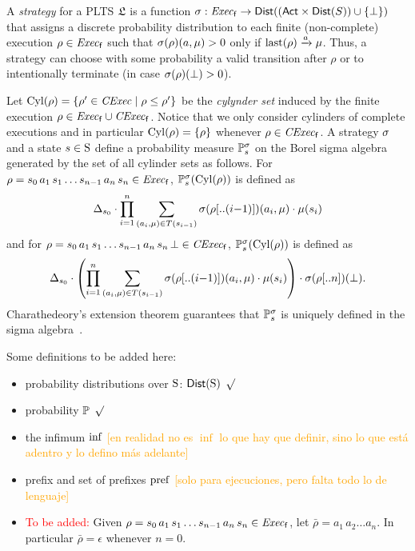 A \emph{strategy} for a PLTS $\model$ is a function $\strat:
\execf \to \dist((\ACT\times\dist(S))\cup\{\complete\})$ that assigns
a discrete probability distribution to each finite (non-complete)
execution $\rho\in\execf$ such that $\strat(\rho)(a,\mu) > 0$ only
if $\last(\rho)\reach{a}\mu$.  Thus, a strategy can choose with some
probability a valid transition after $\rho$ or to intentionally
terminate (in case $\strat(\rho)(\complete)>0$).

Let $\Cyl(\rho)=\{\rho'\in\cexec\mid{\rho\leq\rho'}\}$ be the
\emph{cylynder set} induced by the finite execution
$\rho\in\execf\cup\cexecf$.  Notice that we only consider cylinders of
complete executions and in particular $\Cyl(\rho)=\{\rho\}$ whenever
$\rho\in\cexecf$.
%
A strategy $\strat$ and a state $s\in\S$ define a probability
measure $\Prob^\strat_s$ on the Borel sigma algebra generated by the
set of all cylinder sets as follows.
%
For $\rho = s_0\, a_1\, s_1\ldots s_{n-1}\, a_n\, s_n \in \execf$, $ \textstyle\Prob^\strat_s(\Cyl(\rho))$ is defined as
%
\[
 \Dirac_{s_0}\cdot\prod\limits_{i=1}^n\sum\limits_{(a_i,\mu)\in T(s_{i-1})}\strat(\rho[..(i{-}1)])(a_i,\mu)\cdot\mu(s_i)
\]
%
and for
$\rho = s_0\, a_1\, s_1\ldots s_{n-1}\, a_n\, s_n\, \complete \in \cexecf$, $ \textstyle\Prob^\strat_s(\Cyl(\rho))$ is defined as
%
\[
   \Dirac_{s_0}\cdot\left(\prod\limits_{i=1}^n\sum\limits_{(a_i,\mu)\in T(s_{i-1})}\strat(\rho[..(i{-}1)])(a_i,\mu)\cdot\mu(s_i)\right)\cdot\strat(\rho[..n])(\complete).
\]
%
Charathedeory's extension theorem guarantees that $\Prob^\strat_s$ is
uniquely defined in the sigma algebra~\cite{Segala95}.











\bigskip

Some definitions to be added here:

\begin{itemize}
    \item probability distributions over $\S$: $\dist(\S)$ \textcolor{green}{$\surd$}
    \item probability $\Prob$  \textcolor{green}{$\surd$}
    \item the infimum $\infim$  \textcolor{orange}{[en realidad no es $\inf$ lo que hay que definir, sino lo que est\'a adentro y lo defino m\'as adelante]}
    \item prefix and set of prefixes $\pref$ \textcolor{orange}{[solo para ejecuciones, pero falta todo lo de lenguaje]}
    \item \textcolor{red}{To be added:}
      Given $\rho = s_0\, a_1\, s_1\ldots s_{n-1}\, a_n\, s_n \in \execf$,
      let $\bar{\rho} = a_1\, a_2\ldots a_n$.
      In particular $\bar{\rho} = \epsilon$ whenever $n=0$.

\end{itemize}


